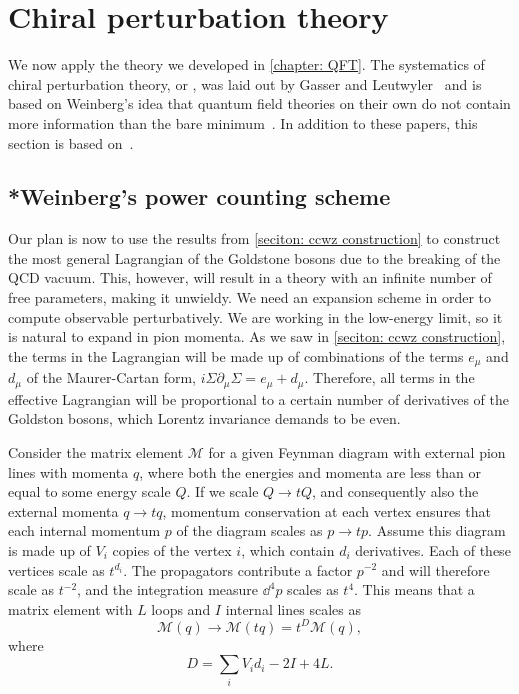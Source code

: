 \section{Chiral perturbation theory}
\label{section: chiral perturbation theory}

We now apply the theory we developed in \autoref{chapter: QFT}.
The systematics of chiral perturbation theory, or \chpt, was laid out by Gasser and Leutwyler~\autocite{gasserChiralPerturbationTheory1984,gasserChiralPerturbationTheory1985} and is based on Weinberg's idea that quantum field theories on their own do not contain more information than the bare minimum~\autocite{weinbergPhenomenologicalLagrangians1979}.
In addition to these papers, this section is based on~\autocite{eckerChiralPerturbationTheory1995,fearingExtensionChiralPerturbation1996,schererIntroductionChiralPerturbation2002}.


\subsection{*Weinberg's power counting scheme}
\label{subsection: Weinberg's power counting scheme}


Our plan is now to use the results from \autoref{seciton: ccwz construction} to construct the most general Lagrangian of the Goldstone bosons due to the breaking of the QCD vacuum.
This, however, will result in a theory with an infinite number of free parameters, making it unwieldy.
We need an expansion scheme in order to compute observable perturbatively.
We are working in the low-energy limit, so it is natural to expand in pion momenta.
As we saw in \autoref{seciton: ccwz construction}, the terms in the Lagrangian will be made up of combinations of the terms $e_\mu$ and $d_\mu$ of the Maurer-Cartan form, $i\Sigma \partial_\mu \Sigma = e_\mu + d_\mu$.
Therefore, all terms in the effective Lagrangian will be proportional to a certain number of derivatives of the Goldston bosons, which Lorentz invariance demands to be even.

Consider the matrix element $\mathcal M$ for a given Feynman diagram with external pion lines with momenta $q$, where both the energies and momenta are less than or equal to some energy scale $Q$.
If we scale $Q\rightarrow tQ$, and consequently also the external momenta $q \rightarrow tq$, momentum conservation at each vertex ensures that each internal momentum $p$ of the diagram scales as $p \rightarrow tp$.
Assume this diagram is made up of $V_i$ copies of the vertex $i$, which contain $d_i$ derivatives.
Each of these vertices scale as $t^{d_i}$.
The propagators contribute a factor $p^{-2}$ and will therefore scale as $t^{-2}$, and the integration measure $\dd^4 p$ scales as $t^4$.
This means that a matrix element with $L$ loops and $I$ internal lines scales as
%
\begin{equation}
    \mathcal M(q) \rightarrow \mathcal M(t q) = t^D \mathcal M(q),
\end{equation}
%
where 
\begin{equation}
    D = \sum_i V_i d_i - 2 I + 4 L.
\end{equation}
%

